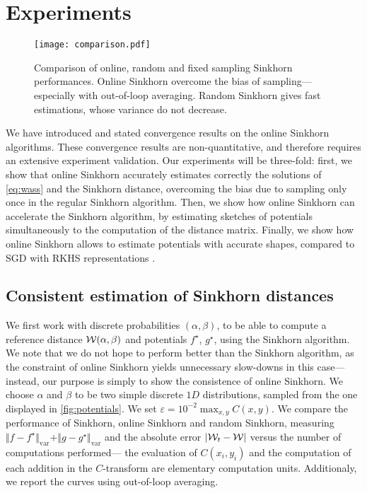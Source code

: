 \section{Experiments}\label{sec:exps}

\begin{figure}[t]
    \centering
    \texttt{[image: comparison.pdf]}
    \caption{Comparison of online, random and fixed sampling Sinkhorn performances. Online Sinkhorn overcome the bias of sampling---especially with out-of-loop averaging. Random Sinkhorn gives fast estimations, whose variance do not decrease.}
    \label{fig:convergence}
\end{figure}

We have introduced and stated convergence results on the online Sinkhorn
algorithms. These convergence results are non-quantitative, and therefore
requires an extensive experiment validation. Our experiments will be three-fold:
first, we show that online Sinkhorn accurately estimates correctly the solutions
of \eqref{eq:wass} and the Sinkhorn distance, overcoming the bias due to
sampling only once in the regular Sinkhorn algorithm. Then, we show
how online Sinkhorn can accelerate the Sinkhorn algorithm, by estimating sketches
of potentials simultaneously to the computation of the distance matrix. Finally, we show
how online Sinkhorn allows to estimate potentials with accurate shapes, compared
to SGD with RKHS representations \citep{2016-genevay-nips}.

\subsection{Consistent estimation of Sinkhorn distances}

We first work with discrete probabilities $(\alpha, \beta)$, to be able to compute a reference
distance $\mathcal{W}(\alpha, \beta)$ and potentials $f^\star$, $g^\star$, using the Sinkhorn
algorithm. We note that we do not hope to perform better than the Sinkhorn
algorithm, as the constraint of online Sinkhorn yields unnecessary slow-downs in
this case---instead, our purpose is simply to show the consistence of online
Sinkhorn. We choose $\alpha$ and $\beta$ to be two simple discrete $1D$
distributions, sampled from the one displayed in \autoref{fig:potentials}. We set
$\varepsilon = 10^{-2} \max_{x,y} C(x,y)$. We
compare the performance of Sinkhorn, online Sinkhorn and random Sinkhorn,
measuring $\Vert f - f^\star \Vert_{\text{var}} + \Vert g - g^\star
\Vert_{\text{var}}$ and the absolute error $| \mathcal{W}_t - \mathcal{W} |$ versus the number
of computations performed--- the evaluation of $C(x_i, y_i)$ and the computation
of each addition in the $C$-transform are elementary computation units.
Additionaly, we report the curves using out-of-loop averaging. 

